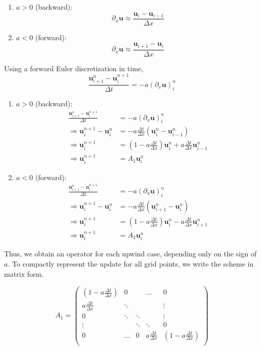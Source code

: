 \begin{enumerate}
    \item{$a > 0$ (backward): $$\partial_x \bm{u} \approx \frac{\bm{u}_i 
    - \bm{u}_{i-1}}{\Delta x} $$}
    \item{$a < 0$ (forward): $$\partial_x \bm{u} \approx \frac
    {\bm{u}_{i+1} - \bm{u}_{i}}{\Delta x} $$}
\end{enumerate}

Using a forward Euler discretization in time,
$$\frac{\bm{u}_{i+1}^n - \bm{u}_{i}^{n+1}}{\Delta t} 
= -a(\partial_x\bm{u})^n_i $$


\begin{enumerate}
\item $a > 0$ (backward):
\begin{align}
\frac{\bm{u}_{i+1}^n - \bm{u}_{i}^{n+1}}{\Delta t}
  &= -a(\partial_x \bm{u})^n_i \\
\Rightarrow \bm{u}_i^{n+1} - \bm{u}_i^n
  &= -a \frac{\Delta t}{\Delta x}(\bm{u}_i^n - \bm{u}_{i-1}^n) \\
\Rightarrow \bm{u}_i^{n+1}
  &= \left(1 - a\frac{\Delta t}{\Delta x}\right)\bm{u}_i^n
     + a\frac{\Delta t}{\Delta x}\bm{u}_{i-1}^n \\
\Rightarrow \bm{u}_i^{n+1}
  &= A_1 \bm{u}_i^n
\end{align}

\item $a < 0$ (forward):
\begin{align}
\frac{\bm{u}_{i+1}^n - \bm{u}_{i}^{n+1}}{\Delta t}
  &= -a(\partial_x \bm{u})^n_i \\
\Rightarrow \bm{u}_i^{n+1} - \bm{u}_i^n
  &= -a \frac{\Delta t}{\Delta x}(\bm{u}_{i+1}^n - \bm{u}_i^n) \\
\Rightarrow \bm{u}_i^{n+1}
  &= \left(1 - a\frac{\Delta t}{\Delta x}\right)\bm{u}_i^n
     - a\frac{\Delta t}{\Delta x}\bm{u}_{i+1}^n \\
\Rightarrow \bm{u}_i^{n+1}
  &= A_2 \bm{u}_i^n
\end{align}
\end{enumerate}

Thus, we obtain an operator for each upwind case, depending only on the
sign of $a$. To compactly represent the update for all grid points, we
write the scheme in matrix form.

$$ 
A_1 = \begin{pmatrix}
 \left(1-a\frac{\Delta t}{\Delta x}\right) & 0 &  & \dots & 0 \\
 a\frac{\Delta t}{\Delta x} & \ddots &  & & \vdots \\
 0 & \ddots & \ddots & & \vdots \\
 \vdots & & \ddots & \ddots & 0 \\
 0 & \dots & 0 & a\frac{\Delta t}{\Delta x} & \left(
    1-a\frac{\Delta t}{\Delta x}\right) \\
\end{pmatrix} $$

